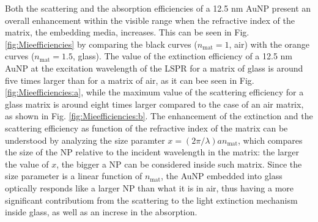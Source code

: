 Both the scattering and the absorption efficiencies of a 12.5 nm AuNP present an overall enhancement within the visible range when the refractive index of the matrix, the embedding media,  increases. This can be seen in Fig. \ref{fig:Mieefficiencies} by comparing the black curves ($n_\text{mat} = 1$, air) with the orange curves ($n_\text{mat} = 1.5$, glass). The value of the extinction efficiency of a 12.5 nm AuNP  at the excitation wavelength of the LSPR for a matrix of glass is around five times larger than for a matrix of air, as it can bee seen in Fig. \ref{fig:Mieefficiencies:a}, while the maximum value of the scattering efficiency for a glass matrix is around eight times larger compared to the case of an air matrix, as shown in Fig. \ref{fig:Mieefficiencies:b}. The enhancement of the extinction and the scattering efficiency as function of the refractive index of the matrix can be understood by analyzing the size paramter $ x = (2 \pi / \lambda ) a n_\text{mat} $, which compares the size of the NP relative to the incident wavelength in the matrix: the larger the value of $x$, the bigger a NP can be considered inside such matrix. Since the size parameter is a linear function of $n_\text{mat}$, the AuNP embedded into glass optically responds like a larger NP than what it is in air, thus having a more significant contributiom from the scattering to the light extinction mechanism inside glass, as well as an increse in the absorption.

